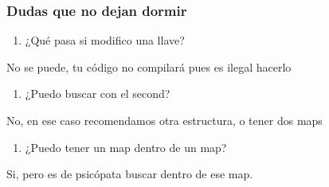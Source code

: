 \documentclass[letterpaper,10pt,spanish]{sphinxmanual}
\begin{document}
\begin{sphinxVerbatim}[commandchars=\\\{\},numbers=left,firstnumber=1,stepnumber=1]
           
                  
\end{sphinxVerbatim}


\subsubsection{Dudas que no dejan dormir}
\label{\detokenize{edd/no_lineales:dudas-que-no-dejan-dormir}}\begin{enumerate}
%
\item {} 
¿Qué pasa si modifico una llave?

\end{enumerate}

No se puede, tu código no compilará pues es ilegal hacerlo 👮🚓🚨
\begin{enumerate}
%
\setcounter{enumi}{1}
\item {} 
¿Puedo buscar con el second?

\end{enumerate}

No, en ese caso recomendamos otra estructura, o tener dos maps 👀
\begin{enumerate}
%
\setcounter{enumi}{2}
\item {} 
¿Puedo tener un map dentro de un map?

\end{enumerate}

Si, pero es de psicópata buscar dentro de ese map.
\end{document}
